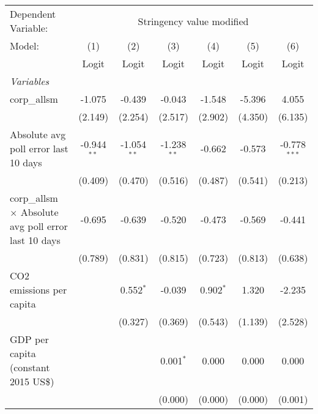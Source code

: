 
\begingroup
\centering
\begin{tabular}{lcccccc}
   \toprule
   Dependent Variable: & \multicolumn{6}{c}{Stringency value modified}\\
   Model:                                                      & (1)           & (2)           & (3)           & (4)          & (5)             & (6)\\  
                                                               &  Logit        & Logit         & Logit         & Logit        & Logit           & Logit\\  
   \midrule
   \emph{Variables}\\
   corp\_allsm                                                 & -1.075        & -0.439        & -0.043        & -1.548       & -5.396          & 4.055\\   
                                                               & (2.149)       & (2.254)       & (2.517)       & (2.902)      & (4.350)         & (6.135)\\   
   Absolute avg poll error last 10 days                        & -0.944$^{**}$ & -1.054$^{**}$ & -1.238$^{**}$ & -0.662       & -0.573          & -0.778$^{***}$\\   
                                                               & (0.409)       & (0.470)       & (0.516)       & (0.487)      & (0.541)         & (0.213)\\   
   corp\_allsm $\times$ Absolute avg poll error last 10 days   & -0.695        & -0.639        & -0.520        & -0.473       & -0.569          & -0.441\\   
                                                               & (0.789)       & (0.831)       & (0.815)       & (0.723)      & (0.813)         & (0.638)\\   
   CO2 emissions per capita                                    &               & 0.552$^{*}$   & -0.039        & 0.902$^{*}$  & 1.320           & -2.235\\   
                                                               &               & (0.327)       & (0.369)       & (0.543)      & (1.139)         & (2.528)\\   
   GDP per capita (constant 2015 US\$)                         &               &               & 0.001$^{*}$   & 0.000        & 0.000           & 0.000\\   
                                                               &               &               & (0.000)       & (0.000)      & (0.000)         & (0.001)\\   

\end{tabular}
